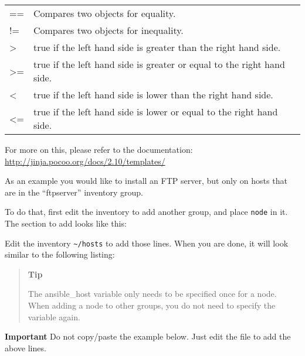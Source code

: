 \begin{longtable}[]{@{}
  >{\raggedright\arraybackslash}p{}
  >{\raggedright\arraybackslash}p{}@{}}
\toprule\noalign{}
\endhead
\bottomrule\noalign{}
\endlastfoot
== & Compares two objects for equality. \\
!= & Compares two objects for inequality. \\
\textgreater{} & true if the left hand side is greater than the right
hand side. \\
\textgreater= & true if the left hand side is greater or equal to the
right hand side. \\
\textless{} & true if the left hand side is lower than the right hand
side. \\
\textless= & true if the left hand side is lower or equal to the right
hand side. \\
\end{longtable}

For more on this, please refer to the documentation:
\url{http://jinja.pocoo.org/docs/2.10/templates/}

As an example you would like to install an FTP server, but only on hosts
that are in the ``ftpserver'' inventory group.

To do that, first edit the inventory to add another group, and place
\texttt{node} in it. The section to add looks like this:

\begin{Shaded}
\begin{Highlighting}[]
\KeywordTok{[ftpserver]}
\end{Highlighting}
\end{Shaded}

Edit the inventory \texttt{\textasciitilde{}/hosts} to
add those lines. When you are done, it will look similar to the
following listing:

\begin{quote}
\textbf{Tip}

The ansible\_host variable only needs to be specified once for a node.
When adding a node to other groups, you do not need to specify the
variable again.
\end{quote}

\textbf{Important} Do not copy/paste the example below. Just edit the
file to add the above lines.

\begin{Shaded}
\begin{Highlighting}[]
\KeywordTok{[web]}
\OtherTok{=} \OtherTok{=}\StringTok{[USER]}

\KeywordTok{[ftpserver]}

\KeywordTok{[control]}
\OtherTok{=} \OtherTok{=}\StringTok{[USER]}
\end{Highlighting}
\end{Shaded}

